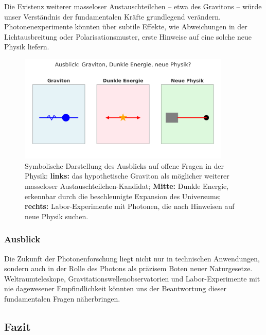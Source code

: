 \begin{tcolorbox}[hypobox, title={Was wäre, wenn das Photon nicht das einzige masselose Boson wäre?}, label={box:photon_neue_physik}]
	\small
	Die Existenz weiterer masseloser Austauschteilchen – etwa des Gravitons – würde unser Verständnis der fundamentalen Kräfte grundlegend verändern. 
	Photonenexperimente könnten über subtile Effekte, wie Abweichungen in der Lichtausbreitung oder Polarisationsmuster, erste Hinweise auf eine solche neue Physik liefern.
\end{tcolorbox}
\begin{figure}[H]
	\centering
	\includegraphics[width=0.9\textwidth]{bilder/photonen_ausblick_fixed.png} %
	\caption{Symbolische Darstellung des Ausblicks auf offene Fragen in der Physik:
		\textbf{links:} das hypothetische Graviton als möglicher weiterer masseloser Austauschteilchen-Kandidat;
		\textbf{Mitte:} Dunkle Energie, erkennbar durch die beschleunigte Expansion des Universums;
		\textbf{rechts:} Labor-Experimente mit Photonen, die nach Hinweisen auf neue Physik suchen.}
	\label{fig:photonen_ausblick}
\end{figure}

\subsubsection{Ausblick}

Die Zukunft der Photonenforschung liegt nicht nur in technischen Anwendungen, sondern auch in der Rolle des Photons als präzisem Boten neuer Naturgesetze. 
Weltraumteleskope, Gravitationswellenobservatorien und Labor-Experimente mit nie dagewesener Empfindlichkeit könnten uns der Beantwortung dieser fundamentalen Fragen näherbringen.

\subsection{Fazit}

